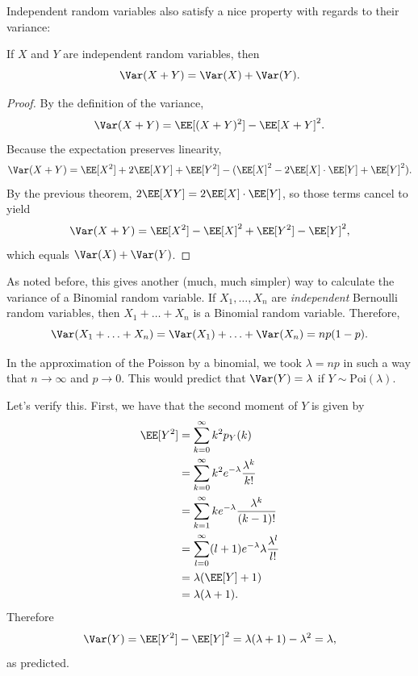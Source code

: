 \documentclass{ximera}
\begin{document}
Independent random variables also satisfy a nice property with regards to their variance:
\begin{theorem}
If $X$ and $Y$ are independent random variables, then 
$$
\Var(X+Y) = \Var(X) + \Var(Y).
$$
\end{theorem}
\begin{proof}
By the definition of the variance, 
$$
\Var(X+Y) = \EE[(X+Y)^2] - \EE[X+Y]^2.
$$
Because the expectation preserves linearity,
$$
\Var(X+Y) = \EE[X^2] + 2\EE[XY] + \EE[Y^2] - (\EE[X]^2 - 2\EE[X] \cdot \EE[Y] + \EE[Y]^2).
$$
By the previous theorem, $2\EE[XY]  = 2\EE[X] \cdot \EE[Y] $, so those terms cancel to yield
$$
\Var(X+Y) = \EE[X^2] - \EE[X]^2 +  \EE[Y^2] - \EE[Y]^2,
$$
which equals $\Var(X) + \Var(Y)$.
\end{proof}

As noted before, this gives another (much, much simpler) way to calculate the variance of a Binomial random variable. If $X_1,\ldots,X_n$ are \textit{independent} Bernoulli random variables, then $X_1 + \ldots + X_n$ is a Binomial random variable. Therefore, 
$$
\Var(X_1 + \ldots + X_n ) = \Var(X_1) + \ldots + \Var(X_n) = np(1-p).
$$

In the approximation of the Poisson by a binomial, we took $\lambda = np$ in such a way that $n\rightarrow \infty$ and $p\rightarrow 0$. This would predict that $\Var(Y) = \lambda$ if $Y \sim \mathrm{Poi}(\lambda)$. 

Let's verify this. First, we have that the second moment of $Y$ is given by
\begin{align*}
\EE[Y^2] &= \sum_{k=0}^{\infty} k^2 p_Y(k) \\
&= \sum_{k=0}^{\infty} k^2 e^{-\lambda} \frac{\lambda^k}{k!} \\
&= \sum_{k=1}^{\infty} k e^{-\lambda} \frac{\lambda^k}{(k-1)!} \\
&= \sum_{l=0}^{\infty} (l+1) e^{-\lambda}  \lambda \frac{\lambda^l}{l!}\\
&= \lambda (\EE[Y] + 1) \\
&= \lambda(\lambda+1).
\end{align*}
Therefore
$$
\Var(Y) = \EE[Y^2] - \EE[Y]^2 = \lambda(\lambda + 1) - \lambda^2 = \lambda,
$$
as predicted.

\newpage
\end{document}
